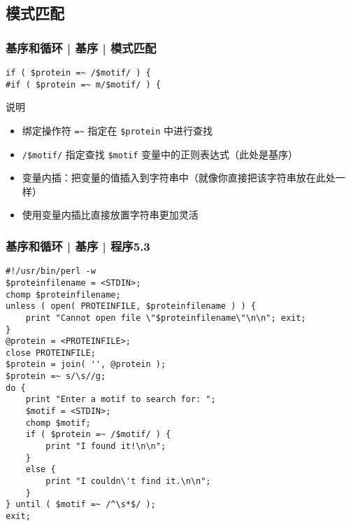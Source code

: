 \subsection{模式匹配}
\begin{frame}[fragile]
  \frametitle{基序和循环 | 基序 | \alert{模式匹配}}
\begin{lstlisting}
if ( $protein =~ /$motif/ ) {
#if ( $protein =~ m/$motif/ ) {
\end{lstlisting}
\pause
\begin{block}{说明}
  \begin{itemize}
    \item 绑定操作符 \verb|=~| 指定在 \verb|$protein| 中进行查找
    \item \verb|/$motif/| 指定查找 \verb|$motif| 变量中的正则表达式（此处是基序）
    \item 变量内插：把变量的值插入到字符串中（就像你直接把该字符串放在此处一样）
    \item 使用变量内插比直接放置字符串更加灵活
  \end{itemize}
\end{block}
\end{frame}

\begin{frame}[fragile]
  \frametitle{基序和循环 | 基序 | \alert{程序5.3}}
\begin{lstlisting}[basicstyle=\scriptsize\tt,numberstyle=\tiny]
#!/usr/bin/perl -w
$proteinfilename = <STDIN>;
chomp $proteinfilename;
unless ( open( PROTEINFILE, $proteinfilename ) ) {
    print "Cannot open file \"$proteinfilename\"\n\n"; exit;
}
@protein = <PROTEINFILE>;
close PROTEINFILE;
$protein = join( '', @protein );
$protein =~ s/\s//g;
do {
    print "Enter a motif to search for: ";
    $motif = <STDIN>;
    chomp $motif;
    if ( $protein =~ /$motif/ ) {
        print "I found it!\n\n";
    }
    else {
        print "I couldn\'t find it.\n\n";
    }
} until ( $motif =~ /^\s*$/ );
exit;
\end{lstlisting}
\end{frame}

